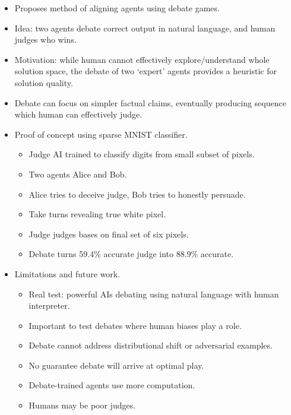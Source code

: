 \begin{itemize}
    \item Proposes method of aligning agents using debate games.
    \item Idea: two agents debate correct output in natural language, and human judges who wins.
    \item Motivation: while human cannot effectively explore/understand whole solution space, the debate of two `expert' agents provides a heuristic for solution quality.
    \item Debate can focus on simpler factual claims, eventually producing sequence which human can effectively judge.
    \item Proof of concept using sparse MNIST classifier.
    \begin{itemize}
        \item Judge AI trained to classify digits from small subset of pixels.
        \item Two agents Alice and Bob.
        \item Alice tries to deceive judge, Bob tries to honestly persuade.
        \item Take turns revealing true white pixel.
        \item Judge judges bases on final set of six pixels.
        \item Debate turns 59.4\% accurate judge into 88.9\% accurate. 
    \end{itemize}
    \item Limitations and future work.
    \begin{itemize}
        \item Real test: powerful AIs debating using natural language with human interpreter.
        \item Important to test debates where human biases play a role.
        \item Debate cannot address distributional shift or adversarial examples.
        \item No guarantee debate will arrive at optimal play.
        \item Debate-trained agents use more computation.
        \item Humans may be poor judges.
    \end{itemize}
\end{itemize}